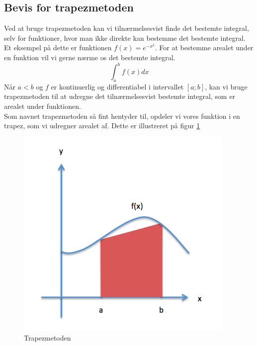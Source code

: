 \documentclass[12pt]{article}
\numberwithin{equation}{section}
\begin{document}
\subsection{Bevis for trapezmetoden}
Ved at bruge trapezmetoden kan vi tilnærmelsesvist finde det bestemte integral, selv for funktioner, hvor man ikke direkte kan bestemme det bestemte integral. Et eksempel på dette er funktionen $f(x)=e^{-x^{2}}$.
For at bestemme arealet under en funktion vil vi gerne nærme os det bestemte integral.
\begin{equation}
\int_{a}^{b}f(x)dx \nonumber
\end{equation}
Når $a<b$ og $f$ er kontinuerlig og differentiabel i intervallet $[a;b]$, kan vi bruge trapezmetoden til at udregne det tilnærmelsesvist bestemte integral, som er arealet under funktionen.\\
Som navnet trapezmetoden så fint hentyder til, opdeler vi vores funktion i en trapez, som vi udregner arealet af. Dette er illustreret på figur \ref{fig:trapezmetoden}
\begin{figure}[H]
\centering
\includegraphics[scale=0.5]{Billeder/trapezmetoden.png}
\caption{Trapezmetoden}
\label{fig:trapezmetoden}
\end{figure}
\end{document}
